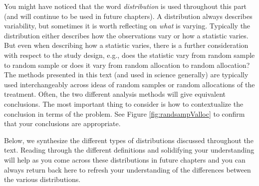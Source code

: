 \documentclass[
  10pt,
  openany]{book}
\begin{document}
You might have noticed that the word \emph{distribution} is used throughout this part (and will continue to be used in future chapters).
A distribution always describes variability, but sometimes it is worth reflecting on \emph{what} is varying.
Typically the distribution either describes how the observations vary or how a statistic varies.
But even when describing how a statistic varies, there is a further consideration with respect to the study design, e.g., does the statistic vary from random sample to random sample or does it vary from random allocation to random allocation?
The methods presented in this text (and used in science generally) are typically used interchangeably across ideas of random samples or random allocations of the treatment.
Often, the two different analysis methods will give equivalent conclusions.
The most important thing to consider is how to contextualize the conclusion in terms of the problem.
See Figure \ref{fig:randsampValloc} to confirm that your conclusions are appropriate.

Below, we synthesize the different types of distributions discussed throughout the text.
Reading through the different definitions and solidifying your understanding will help as you come across these distributions in future chapters and you can always return back here to refresh your understanding of the differences between the various distributions.
\end{document}
